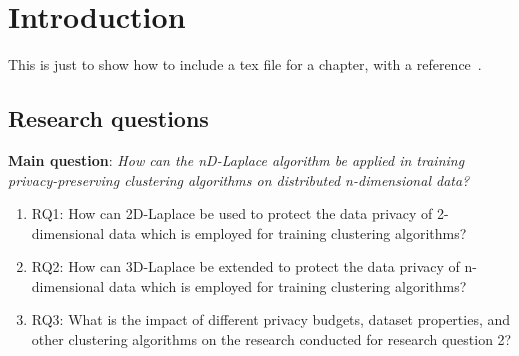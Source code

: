 \chapter{Introduction}
This is just to show how to include a tex file for a chapter, with a reference~\citep{Dijkstra-1968}.

\section{Research questions}
\textbf{Main question}: \newline
\textit{How can the nD-Laplace algorithm be applied in training privacy-preserving clustering algorithms on distributed n-dimensional data?}


\begin{enumerate}
  \item RQ1: How can 2D-Laplace be used to protect the data privacy of 2-dimensional data which is employed for training clustering algorithms?
  \item RQ2: How can 3D-Laplace be extended to protect the data privacy of n-dimensional data which is employed for training clustering algorithms?
  \item RQ3: What is the impact of different privacy budgets, dataset properties, and other clustering algorithms on the research conducted for research question 2?
\end{enumerate}